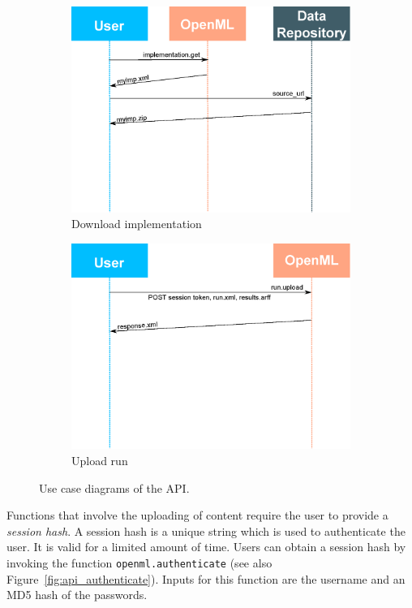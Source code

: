 \documentclass[10pt, twoside]{article}
\begin{document}
\begin{figure}[ht!]
\begin{subfigure}{.48\textwidth}
		\includegraphics[width=\textwidth]{eps/api_implementationget.eps}
		\caption{Download implementation}
		\label{fig:api_implementation}
	\end{subfigure}
	\hspace{2 mm}
	\begin{subfigure}{.48\textwidth}
		\centering
		\includegraphics[width=\textwidth]{eps/api_run.eps}
		\caption{Upload run}
		\label{fig:api_run}
	\end{subfigure}
	\caption{Use case diagrams of the API.}
	\label{fig:apidiagrams}
\end{figure} 

Functions that involve the uploading of content require the user to provide a \emph{session hash}. A session hash is a unique string which is used to authenticate the user. It is valid for a limited amount of time. Users can obtain a session hash by invoking the function \texttt{openml.authenticate} (see also Figure~\ref{fig:api_authenticate}). Inputs for this function are the username and an MD5 hash of the passwords. 
\end{document}
